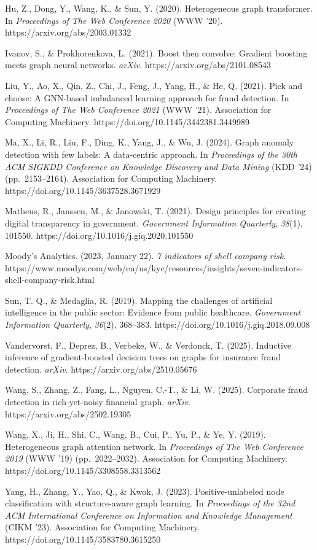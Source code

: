 \documentclass[11pt,]{article}
\begin{document}
Hu, Z., Dong, Y., Wang, K., \& Sun, Y. (2020). Heterogeneous graph
transformer. In \emph{Proceedings of The Web Conference 2020} (WWW '20).
https://arxiv.org/abs/2003.01332

Ivanov, S., \& Prokhorenkova, L. (2021). Boost then convolve: Gradient
boosting meets graph neural networks. \emph{arXiv}.
https://arxiv.org/abs/2101.08543

Liu, Y., Ao, X., Qin, Z., Chi, J., Feng, J., Yang, H., \& He, Q. (2021).
Pick and choose: A GNN-based imbalanced learning approach for fraud
detection. In \emph{Proceedings of The Web Conference 2021} (WWW '21).
Association for Computing Machinery.
https://doi.org/10.1145/3442381.3449989

Ma, X., Li, R., Liu, F., Ding, K., Yang, J., \& Wu, J. (2024). Graph
anomaly detection with few labels: A data-centric approach. In
\emph{Proceedings of the 30th ACM SIGKDD Conference on Knowledge
Discovery and Data Mining} (KDD '24) (pp.~2153--2164). Association for
Computing Machinery. https://doi.org/10.1145/3637528.3671929

Matheus, R., Janssen, M., \& Janowski, T. (2021). Design principles for
creating digital transparency in government. \emph{Government
Information Quarterly}, \emph{38}(1), 101550.
https://doi.org/10.1016/j.giq.2020.101550

Moody's Analytics. (2023, January 22). \emph{7 indicators of shell
company risk}.
https://www.moodys.com/web/en/us/kyc/resources/insights/seven-indicators-shell-company-risk.html

Sun, T. Q., \& Medaglia, R. (2019). Mapping the challenges of artificial
intelligence in the public sector: Evidence from public healthcare.
\emph{Government Information Quarterly}, \emph{36}(2), 368--383.
https://doi.org/10.1016/j.giq.2018.09.008

Vandervorst, F., Deprez, B., Verbeke, W., \& Verdonck, T. (2025).
Inductive inference of gradient-boosted decision trees on graphs for
insurance fraud detection. \emph{arXiv}.
https://arxiv.org/abs/2510.05676

Wang, S., Zhang, Z., Fang, L., Nguyen, C.-T., \& Li, W. (2025).
Corporate fraud detection in rich-yet-noisy financial graph.
\emph{arXiv}. https://arxiv.org/abs/2502.19305

Wang, X., Ji, H., Shi, C., Wang, B., Cui, P., Yu, P., \& Ye, Y. (2019).
Heterogeneous graph attention network. In \emph{Proceedings of The Web
Conference 2019} (WWW '19) (pp.~2022--2032). Association for Computing
Machinery. https://doi.org/10.1145/3308558.3313562

Yang, H., Zhang, Y., Yao, Q., \& Kwok, J. (2023). Positive-unlabeled
node classification with structure-aware graph learning. In
\emph{Proceedings of the 32nd ACM International Conference on
Information and Knowledge Management} (CIKM '23). Association for
Computing Machinery. https://doi.org/10.1145/3583780.3615250
\end{document}

